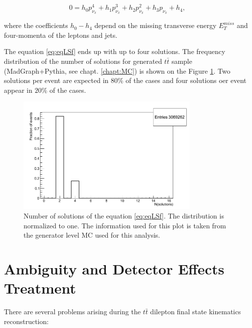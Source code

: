 \begin{equation}\label{eq:eqLSf}
 0 = h_{0} p_{\nu_{x}}^{4} + h_{1} p_{\nu_{x}}^{3} + h_{2} p_{\nu_{x}}^{2} + h_{3} p_{\nu_{x}} + h_{4},
\end{equation}

where the coefficients $h_{0} - h_{4}$ \cite{LSpaper, LSerrat} depend on the missing transverse energy $E_{T}^{miss}$ and four-momenta of the
leptons and jets. 

The equation \ref{eq:eqLSf} ends up with up to four solutions. The frequency distribution of the number of solutions for generated $t\bar{t}$ sample (MadGraph+Pythia,
see chapt. \ref{chapt:MC}) is shown on the Figure \ref{fig:LSNsol}. Two solutions per event are expected in 80$\%$ of the cases and four solutions oer event appear in 
$20\%$ of the cases.

\begin{figure}[t]
  \centering
  \includegraphics[width=0.8\textwidth]{05_kinReco/plots/KinReco_Nsolutions.png}
  \caption{Number of solutions of the equation \ref{eq:eqLSf}. The distribution is normalized to one. The information used for this plot is taken
  from the generator level MC used for this analysis.}
  \label{fig:LSNsol}
\end{figure}



\section{Ambiguity and Detector Effects Treatment}\label{sec:SolSer}

There are several problems arising during the $t\bar{t}$ dilepton final state kinematics reconstruction:

